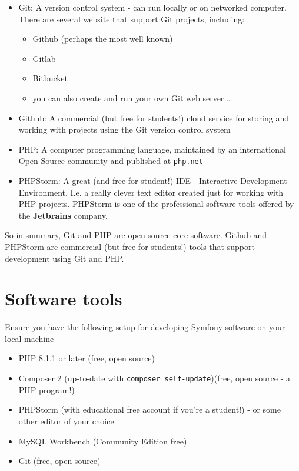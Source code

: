 \documentclass[a4paperpaper,openright]{book}
\providecommand{\tightlist}{%
  \setlength{\itemsep}{0pt}\setlength{\parskip}{0pt}}
\begin{document}
\begin{itemize}
\item
  Git: A version control system - can run locally or on networked
  computer. There are several website that support Git projects,
  including:

  \begin{itemize}
  \tightlist
  \item
    Github (perhaps the most well known)
  \item
    Gitlab
  \item
    Bitbucket
  \item
    you can also create and run your own Git web server \ldots{}
  \end{itemize}
\item
  Github: A commercial (but free for students!) cloud service for
  storing and working with projects using the Git version control system
\item
  PHP: A computer programming language, maintained by an international
  Open Source community and published at \texttt{php.net}
\item
  PHPStorm: A great (and free for student!) IDE - Interactive
  Development Environment. I.e. a really clever text editor created just
  for working with PHP projects. PHPStorm is one of the professional
  software tools offered by the \textbf{Jetbrains} company.
\end{itemize}

So in summary, Git and PHP are open source core software. Github and
PHPStorm are commercial (but free for students!) tools that support
development using Git and PHP.

\hypertarget{software-tools}{%
\section{Software tools}\label{software-tools}}

Ensure you have the following setup for developing Symfony software on
your local machine

\begin{itemize}
\tightlist
\item
  PHP 8.1.1 or later (free, open source)
\item
  Composer 2 (up-to-date with \texttt{composer\ self-update})(free, open
  source - a PHP program!)
\item
  PHPStorm (with educational free account if you're a student!) - or
  some other editor of your choice
\item
  MySQL Workbench (Community Edition free)
\item
  Git (free, open source)
\end{itemize}
\end{document}

